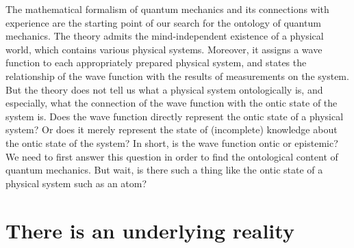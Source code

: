 
The mathematical formalism of quantum mechanics and its connections with experience are the starting point of our search for the ontology of quantum mechanics. The theory admits the mind-independent existence of a physical world, which contains various physical systems. Moreover, it assigns a wave function to each appropriately prepared physical system, and states the relationship of the wave function with the results of measurements on the system.
But the theory does not tell us what a physical system ontologically is, and especially, what the connection of the wave function with the ontic state of the system is.
Does the wave function directly represent the ontic state of a physical system? Or does it merely represent the state of (incomplete) knowledge about the ontic state of the system? In short, is the wave function ontic or epistemic? We need to first answer this question in order to find the ontological content of quantum mechanics. But wait, is there such a thing like the ontic state of a physical system such as an atom?

\section{There is an underlying reality}



